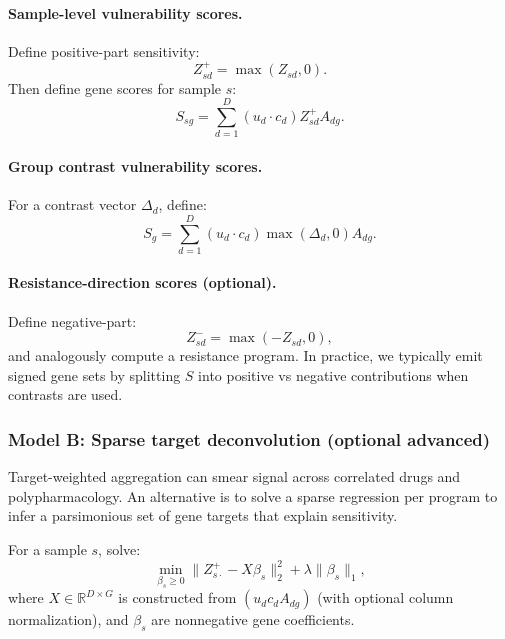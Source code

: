 \documentclass[11pt]{article}
\begin{document}
\paragraph{Sample-level vulnerability scores.}
Define positive-part sensitivity:
\begin{equation}
Z^+_{sd} = \max(Z_{sd}, 0).
\end{equation}
Then define gene scores for sample $s$:
\begin{equation}
S_{sg} = \sum_{d=1}^D \left(u_d \cdot c_d\right) Z^+_{sd} A_{dg}.
\end{equation}

\paragraph{Group contrast vulnerability scores.}
For a contrast vector $\Delta_d$, define:
\begin{equation}
S_g = \sum_{d=1}^D \left(u_d \cdot c_d\right) \max(\Delta_d, 0) A_{dg}.
\end{equation}

\paragraph{Resistance-direction scores (optional).}
Define negative-part:
\begin{equation}
Z^-_{sd} = \max(-Z_{sd}, 0),
\end{equation}
and analogously compute a resistance program. In practice, we typically emit signed gene sets by splitting $S$ into positive vs negative contributions when contrasts are used.

\subsubsection{Model B: Sparse target deconvolution (optional advanced)}
Target-weighted aggregation can smear signal across correlated drugs and polypharmacology. An alternative is to solve a sparse regression per program to infer a parsimonious set of gene targets that explain sensitivity.

For a sample $s$, solve:
\begin{equation}
\min_{\beta_s \ge 0} \|Z^+_{s\cdot} - X \beta_s\|_2^2 + \lambda \|\beta_s\|_1,
\end{equation}
where $X \in \mathbb{R}^{D \times G}$ is constructed from $(u_d c_d A_{dg})$ (with optional column normalization), and $\beta_s$ are nonnegative gene coefficients.
\end{document}
